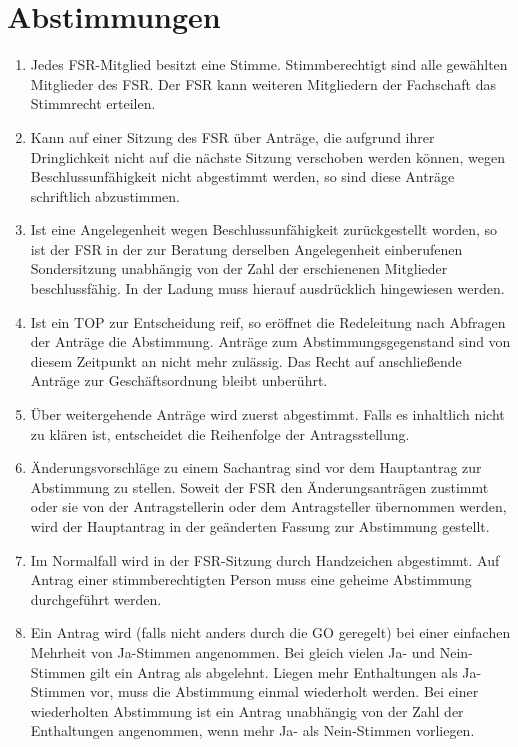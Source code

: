 \documentclass[
	a4paper,
	12pt,
	oneside,
	parskip=half-,
	pagesize,
	headsepline,
	german,
	ngerman
]{scrartcl}
\begin{document}
\section{Abstimmungen}
\label{sec:abstimmungen}
\begin{enumerate}
	\item Jedes FSR-Mitglied besitzt eine Stimme. Stimmberechtigt sind alle gewählten Mitglieder des FSR. Der FSR kann weiteren Mitgliedern der Fachschaft das Stimmrecht erteilen.
	\item Kann auf einer Sitzung des FSR über Anträge, die aufgrund ihrer Dringlichkeit nicht auf die nächste Sitzung verschoben werden können, wegen Beschlussunfähigkeit nicht abgestimmt werden, so sind diese Anträge schriftlich abzustimmen.
	\item Ist eine Angelegenheit wegen Beschlussunfähigkeit zurückgestellt worden, so ist der FSR in der 	zur Beratung derselben Angelegenheit einberufenen Sondersitzung unabhängig von der Zahl der erschienenen Mitglieder beschlussfähig. In der Ladung muss hierauf ausdrücklich hingewiesen werden. 
	\item Ist ein TOP zur Entscheidung reif, so eröffnet die Redeleitung nach Abfragen der Anträge die Abstimmung. Anträge zum Abstimmungsgegenstand sind von diesem Zeitpunkt an nicht mehr zulässig. Das Recht auf anschließende Anträge zur Geschäftsordnung bleibt unberührt.
	\item Über weitergehende Anträge wird zuerst abgestimmt. Falls es inhaltlich nicht zu klären ist, entscheidet die Reihenfolge der Antragsstellung.
	\item Änderungsvorschläge zu einem Sachantrag sind vor dem Hauptantrag zur Abstimmung zu stellen. Soweit der FSR den Änderungsanträgen zustimmt oder sie von der Antragstellerin oder dem Antragsteller übernommen werden, wird der Hauptantrag in der geänderten Fassung zur Abstimmung gestellt.
	\item Im Normalfall wird in der FSR-Sitzung durch Handzeichen abgestimmt. Auf Antrag einer stimmberechtigten Person muss eine geheime Abstimmung durchgeführt werden.
	\item Ein Antrag wird (falls nicht anders durch die GO geregelt) bei einer einfachen Mehrheit von Ja-Stimmen angenommen. Bei gleich vielen Ja- und Nein-Stimmen gilt ein Antrag als abgelehnt. Liegen mehr Enthaltungen als Ja-Stimmen vor, muss die Abstimmung einmal wiederholt werden. Bei einer wiederholten Abstimmung ist ein Antrag unabhängig von der Zahl der Enthaltungen angenommen, wenn mehr Ja- als Nein-Stimmen vorliegen.
	\label{item:abstimmungsmodus}
\end{enumerate}
\end{document}
